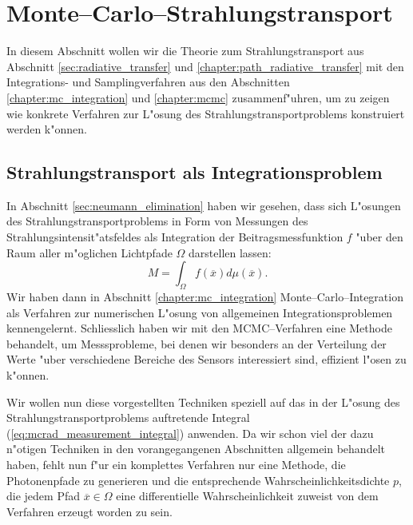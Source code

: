 	\chapter{Monte--Carlo--Strahlungstransport}\label{sec:mc_radiativetransfer}
	In diesem Abschnitt wollen wir die Theorie zum Strahlungstransport aus Abschnitt \ref{sec:radiative_transfer} und \ref{chapter:path_radiative_transfer} mit den Integrations- und Samplingverfahren aus den Abschnitten \ref{chapter:mc_integration} und \ref{chapter:mcmc} zusammenf"uhren, um zu zeigen wie konkrete Verfahren zur L"osung des Strahlungstransportproblems konstruiert werden k"onnen.
	\section{Strahlungstransport als Integrationsproblem}
	In Abschnitt \ref{sec:neumann_elimination} haben wir gesehen, dass sich L"osungen des Strahlungstransportproblems in Form von Messungen des Strahlungsintensit"atsfeldes als Integration der Beitragsmessfunktion $f$ "uber den Raum aller m"oglichen Lichtpfade $\Omega$ darstellen lassen:
	\begin{equation}
		M=\int_\Omega f({\overline x})d\mu({\overline x}).
		\label{eq:mcrad_measurement_integral}
	\end{equation}
	Wir haben dann in Abschnitt \ref{chapter:mc_integration} Monte--Carlo--Integration als Verfahren zur numerischen L"osung von allgemeinen Integrationsproblemen kennengelernt. Schliesslich haben wir mit den MCMC--Verfahren eine Methode behandelt, um Messsprobleme, bei denen wir besonders an der Verteilung der Werte "uber verschiedene Bereiche des Sensors interessiert sind, effizient l"osen zu k"onnen.
	
	Wir wollen nun diese vorgestellten Techniken speziell auf das in der L"osung des Strahlungstransportproblems auftretende Integral (\ref{eq:mcrad_measurement_integral}) anwenden. Da wir schon viel der dazu n"otigen Techniken in den vorangegangenen Abschnitten allgemein behandelt haben, fehlt nun f"ur ein komplettes Verfahren nur eine Methode, die Photonenpfade zu generieren und die entsprechende Wahrscheinlichkeitsdichte $p$, die jedem Pfad ${\overline x}\in\Omega$ eine differentielle Wahrscheinlichkeit zuweist von dem Verfahren erzeugt worden zu sein.
	
